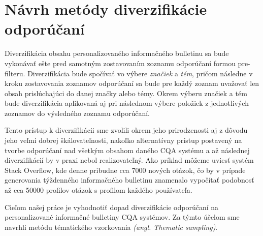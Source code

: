 \section{Návrh metódy diverzifikácie odporúčaní}

Diverzifikácia obsahu personalizovaného informačného bulletinu sa bude vykonávať ešte pred samotným zostavovaním
zoznamu odporúčaní formou pre-filteru. Diverzifikácia bude spočívať vo výbere \textit{značiek} a \textit{tém}, pričom
následne v kroku zostavovania zoznamov odporúčaní sa bude pre každý zoznam uvažovať len obsah prislúchajúci do danej
značky alebo témy. Okrem výberu značiek a tém bude diverzifikácia aplikovaná aj pri následnom výbere položiek z jednotlivých
zoznamov do výsledného zoznamu odporúčaní.

Tento prístup k diverzifikácii sme zvolili okrem jeho prirodzenosti aj z dôvodu jeho veľmi dobrej škálovateľnosti,
nakoľko alternatívny prístup postavený na tvorbe odporúčaní nad všetkým obsahom daného CQA systému a až následnej
diverzifikácií by v praxi nebol realizovateľný. Ako príklad môžeme uviesť systém Stack Overflow, kde denne pribudne
cca 7000 nových otázok, čo by v prípade generovania týždenného informačného bulletinu znamenalo vypočítať podobnosť
až cca 50000 profilov otázok s profilom každého používateľa.

Cieľom našej práce je vyhodnotiť dopad diverzifikácie odporúčaní na personalizované informačné bulletiny CQA systémov.
Za týmto účelom sme navrhli metódu tématického vzorkovania \textit{(angl. Thematic sampling)}.


